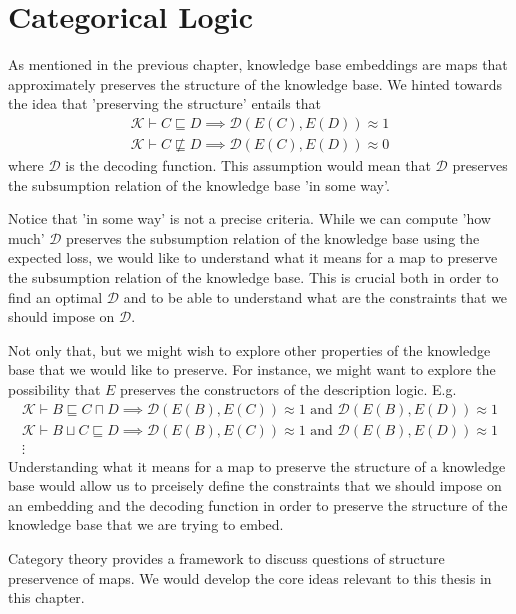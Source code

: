%
\chapter*{\thechapter \quad Categorical Logic}
As mentioned in the previous chapter,
knowledge base embeddings are maps that approximately preserves the structure of the knowledge base.
We hinted towards the idea that 'preserving the structure' entails
that
\begin{gather*}
    \mathcal{K}\vdash C\sqsubseteq D \implies \mathcal{D}(E(C),E(D))\approx 1\\
    \mathcal{K}\vdash C\not\sqsubseteq D \implies \mathcal{D}(E(C),E(D))\approx 0
\end{gather*}
where $\mathcal{D}$ is the decoding function.
This assumption would mean that $\mathcal{D}$ preserves the subsumption relation of the knowledge base
'in some way'.

Notice that 'in some way' is not a precise criteria. While we can compute 'how much' 
$\mathcal{D}$ preserves the subsumption relation of the knowledge base using the expected loss,
we would like to understand what it means for a map to preserve the subsumption relation of the knowledge base.
This is crucial both in order to find an optimal $\mathcal{D}$
and to be able to understand what are the constraints that we should impose on $\mathcal{D}$.

Not only that, but we might wish to explore other properties of the knowledge base that we would like to preserve.
For instance, we might want to explore the possibility that $E$
preserves the constructors of the description logic. E.g.
\begin{gather*}
    \mathcal{K}\vdash B\sqsubseteq C\sqcap D \implies \mathcal{D}(E(B),E(C))\approx 1\text{ and } \mathcal{D}(E(B),E(D))\approx 1
    \\
    \mathcal{K}\vdash B\sqcup C\sqsubseteq D \implies \mathcal{D}(E(B),E(C))\approx 1\text{ and } \mathcal{D}(E(B),E(D))\approx 1
    \\
    \vdots
\end{gather*}
Understanding what it means for a map to preserve the structure of a knowledge base
would allow us to prceisely define the constraints that we should impose on 
an embedding and the decoding function in order to preserve the structure of the knowledge base
that we are trying to embed.

Category theory provides a framework to discuss questions of structure preservence of maps.
We would develop the core ideas relevant to this thesis in this chapter.

